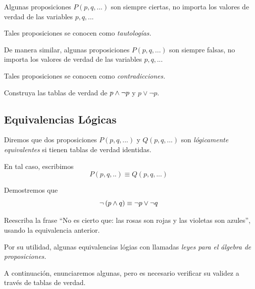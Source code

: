  Algunas proposiciones $P(p,q,...)$ son siempre ciertas, no importa los valores de verdad de las variables $p,q,...$ 
  
 
 Tales proposiciones se conocen como \emph{tautolog\'ias.}



 De manera similar, algunas proposiciones $P(p,q,...)$ son siempre falsas, no importa los valores de verdad de las variables $p,q,...$ 
  
 
 Tales proposiciones se conocen como \emph{contradicciones.}



 \begin{exmp}
  Construya las tablas de verdad de $p \wedge \neg p$ y $p \vee \neg p.$
 \end{exmp}



\subsection{Equivalencias L\'ogicas}


 Diremos que dos proposiciones $P(p,q,...)$ y $Q(p,q,...)$ son \emph{l\'ogicamente equivalentes} si tienen tablas de verdad identidas. 
 
 
 En tal caso, escribimos $$P(p,q,..)\equiv Q(p,q,...)$$



 \begin{exmp} Demostremos que 
  $$
  \neg\left( p \wedge q \right) \equiv \neg p \vee \neg q
  $$
 \end{exmp}




 \begin{exmp}
  Reescriba la frase ``No es cierto que: las rosas son rojas y las violetas son azules'', usando la equivalencia anterior.
 \end{exmp}





 Por su utilidad, algunas equivalencias l\'ogias con llamadas \emph{leyes para el \'algebra de proposiciones.}
 
 
 A continuaci\'on, enunciaremos algunas, pero es necesario verificar su validez a trav\'es de tablas de verdad. 



